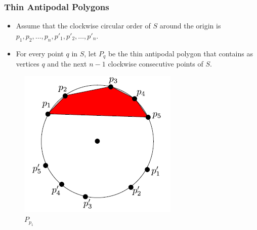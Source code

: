 \documentclass{beamer}
\begin{document}
\begin{frame}
\frametitle{Thin Antipodal Polygons}

\begin{itemize}
\item<1-> Assume that the clockwise circular order of $S$ around the origin is $p_1, p_2, \dots , p_n,
p'_1, p'_2,\dots , p'_n$.
\item<2-> For every point $q$ in $S$, let $P_q$ be the thin antipodal polygon that
contains as vertices $q$ and the next $n-1$ clockwise consecutive points of $S$.
\end{itemize}\pause

\begin{figure}
\includegraphics[scale=0.6]{p1}
\caption{$P_{p_1}$}
\end{figure}
\end{frame}
\end{document}
